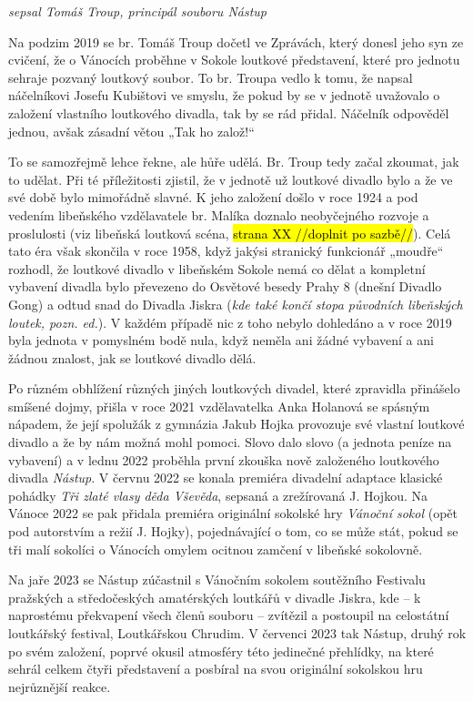 \emph{sepsal Tomáš Troup, principál souboru Nástup}

Na podzim 2019 se br. Tomáš Troup dočetl ve Zprávách, který donesl jeho
syn ze cvičení, že o Vánocích proběhne v Sokole loutkové představení,
které pro jednotu sehraje pozvaný loutkový soubor. To br. Troupa vedlo k
tomu, že napsal náčelníkovi Josefu Kubištovi ve smyslu, že pokud by se v
jednotě uvažovalo o založení vlastního loutkového divadla, tak by se rád
přidal. Náčelník odpověděl jednou, avšak zásadní větou „Tak ho
založ!{}``

To se samozřejmě lehce řekne, ale hůře udělá. Br. Troup tedy začal
zkoumat, jak to udělat. Při té příležitosti zjistil, že v jednotě už
loutkové divadlo bylo a že ve své době bylo mimořádně slavné. K jeho
založení došlo v roce 1924 a pod vedením libeňského vzdělavatele br.
Malíka doznalo neobyčejného rozvoje a proslulosti (viz libeňská loutková
scéna, \hl{strana XX //doplnit po sazbě//}). Celá tato éra však skončila
v roce 1958, když jakýsi stranický funkcionář „moudře`` rozhodl, že
loutkové divadlo v libeňském Sokole nemá co dělat a kompletní vybavení
divadla bylo převezeno do Osvětové besedy Prahy 8 (dnešní Divadlo Gong)
a odtud snad do Divadla Jiskra (\emph{kde také končí stopa původních
libeňských loutek, pozn. ed.}). V každém případě nic z toho nebylo
dohledáno a v roce 2019 byla jednota v pomyslném bodě nula, když neměla
ani žádné vybavení a ani žádnou znalost, jak se loutkové divadlo dělá.

Po různém obhlížení různých jiných loutkových divadel, které zpravidla
přinášelo smíšené dojmy, přišla v roce 2021 vzdělavatelka Anka Holanová
se spásným nápadem, že její spolužák z gymnázia Jakub Hojka provozuje
své vlastní loutkové divadlo a že by nám možná mohl pomoci. Slovo dalo
slovo (a jednota peníze na vybavení) a v lednu 2022 proběhla první
zkouška nově založeného loutkového divadla \emph{Nástup}. V červnu 2022
se konala premiéra divadelní adaptace klasické pohádky \emph{Tři zlaté
vlasy děda Vševěda}, sepsaná a zrežírovaná J. Hojkou. Na Vánoce 2022 se
pak přidala premiéra originální sokolské hry \emph{Vánoční sokol} (opět
pod autorstvím a režií J. Hojky), pojednávající o tom, co se může stát,
pokud se tři malí sokolíci o Vánocích omylem ocitnou zamčení v libeňské
sokolovně.

Na jaře 2023 se Nástup zúčastnil s Vánočním sokolem soutěžního Festivalu
pražských a středočeských amatérských loutkářů v divadle Jiskra, kde --
k naprostému překvapení všech členů souboru -- zvítězil a postoupil na
celostátní loutkářský festival, Loutkářskou Chrudim. V červenci 2023 tak
Nástup, druhý rok po svém založení, poprvé okusil atmosféry této
jedinečné přehlídky, na které sehrál celkem čtyři představení a posbíral
na svou originální sokolskou hru nejrůznější reakce.

